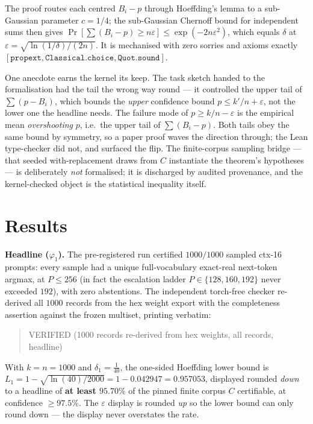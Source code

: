 \documentclass[11pt,a4paper]{article}
\begin{document}
The proof routes each centred \(B_i - p\) through Hoeffding's lemma to a sub-Gaussian parameter \(c = 1/4\); the sub-Gaussian Chernoff bound for independent sums then gives \(\Pr[\sum (B_i - p) \ge n\varepsilon] \le \exp(-2n\varepsilon^2)\), which equals \(\delta\) at \(\varepsilon = \sqrt{\ln(1/\delta)/(2n)}\). It is mechanised with zero sorries and axioms exactly \([\texttt{propext},\allowbreak \texttt{Classical.choice},\allowbreak \texttt{Quot.sound}]\).

One anecdote earns the kernel its keep. The task sketch handed to the formalisation had the tail the wrong way round --- it controlled the upper tail of \(\sum (p - B_i)\), which bounds the \emph{upper} confidence bound \(p \le k'/n + \varepsilon\), not the lower one the headline needs. The failure mode of \(p \ge k/n - \varepsilon\) is the empirical mean \emph{overshooting} \(p\), i.e.\ the upper tail of \(\sum (B_i - p)\). Both tails obey the same bound by symmetry, so a paper proof waves the direction through; the Lean type-checker did not, and surfaced the flip. The finite-corpus sampling bridge --- that seeded with-replacement draws from \(C\) instantiate the theorem's hypotheses --- is deliberately \emph{not} formalised; it is discharged by audited provenance, and the kernel-checked object is the statistical inequality itself.

\section{Results}

\textbf{Headline (\(\varphi_1\)).} The pre-registered run certified \(1000/1000\) sampled ctx-16 prompts: every sample had a unique full-vocabulary exact-real next-token argmax, at \(P \le 256\) (in fact the escalation ladder \(P \in \{128,160,192\}\) never exceeded \(192\)), with zero abstentions. The independent torch-free checker re-derived all \(1000\) records from the hex weight export with the completeness assertion against the frozen multiset, printing verbatim:
\begin{quote}
\small\ttfamily VERIFIED (1000 records re-derived from hex weights, all records, headline)
\end{quote}
With \(k = n = 1000\) and \(\delta_1 = \tfrac{1}{40}\), the one-sided Hoeffding lower bound is \(L_1 = 1 - \sqrt{\ln(40)/2000} = 1 - 0.042947 = 0.957053\), displayed rounded \emph{down} to a headline of \textbf{at least \(95.70\%\)} of the pinned finite corpus \(C\) certifiable, at confidence \(\ge 97.5\%\). The \(\varepsilon\) display is rounded \emph{up} so the lower bound can only round down --- the display never overstates the rate.
\end{document}
